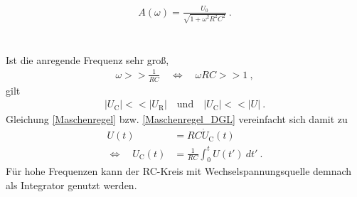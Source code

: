 \begin{align}
	A(\omega) = \frac{U_0}{\sqrt{1+\omega^2R^2C^2}} \ .
	\label{eq:amplitude}
\end{align} \\
\ \\
Ist die anregende Frequenz sehr groß, 
\begin{align}
	\omega >> \frac{1}{RC} \quad\Leftrightarrow\quad \omega RC >> 1 \ ,
\end{align}
gilt
\begin{align}
	|U_\text{C}| << |U_\text{R}| \quad \text{und} \quad |U_\text{C}| << |U| \ .
\end{align}
Gleichung \eqref{Maschenregel} bzw. \eqref{Maschenregel_DGL} vereinfacht sich damit zu
\begin{align}
	U(t) &= RC\dot{U}_\text{C}(t) \\
	\Leftrightarrow\quad U_\text{C}(t) &= \frac{1}{RC}\int_0^t U(t')\ dt' \ .
\end{align}
Für hohe Frequenzen kann der RC-Kreis mit Wechselspannungsquelle demnach als Integrator genutzt werden.
